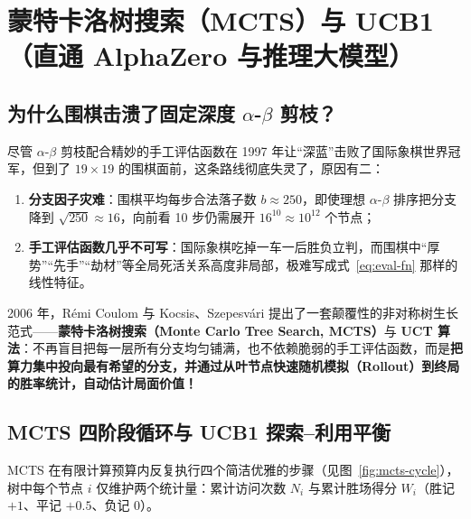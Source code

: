 \section{蒙特卡洛树搜索（MCTS）与 UCB1（直通 AlphaZero 与推理大模型）}\label{sec:mcts}

\subsection{为什么围棋击溃了固定深度 $\alpha$-$\beta$ 剪枝？}

尽管 $\alpha$-$\beta$ 剪枝配合精妙的手工评估函数在 1997 年让“深蓝”击败了国际象棋世界冠军，但到了 $19\times 19$ 的围棋面前，这条路线彻底失灵了，原因有二：
\begin{enumerate}
  \item \textbf{分支因子灾难}：围棋平均每步合法落子数 $b \approx 250$，即使理想 $\alpha$-$\beta$ 排序把分支降到 $\sqrt{250} \approx 16$，向前看 10 步仍需展开 $16^{10} \approx 10^{12}$ 个节点；
  \item \textbf{手工评估函数几乎不可写}：国际象棋吃掉一车一后胜负立判，而围棋中“厚势”“先手”“劫材”等全局死活关系高度非局部，极难写成式~\eqref{eq:eval-fn} 那样的线性特征。
\end{enumerate}

2006 年，Rémi Coulom 与 Kocsis、Szepesvári 提出了一套颠覆性的非对称树生长范式——\textbf{蒙特卡洛树搜索（Monte Carlo Tree Search, MCTS）}与 \textbf{UCT 算法}：不再盲目把每一层所有分支均匀铺满，也不依赖脆弱的手工评估函数，而是\textbf{把算力集中投向最有希望的分支，并通过从叶节点快速随机模拟（Rollout）到终局的胜率统计，自动估计局面价值！}

\subsection{MCTS 四阶段循环与 UCB1 探索--利用平衡}

MCTS 在有限计算预算内反复执行四个简洁优雅的步骤（见图~\ref{fig:mcts-cycle}），树中每个节点 $i$ 仅维护两个统计量：累计访问次数 $N_i$ 与累计胜场得分 $W_i$（胜记 $+1$、平记 $+0.5$、负记 $0$）。

